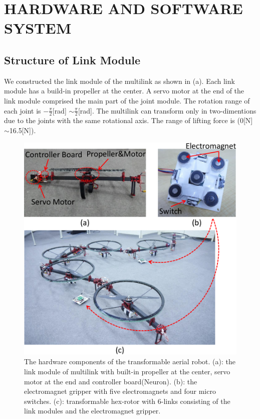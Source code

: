 \section{HARDWARE AND SOFTWARE SYSTEM}
\subsection{Structure of Link Module}
We constructed the link module of the multilink as shown in (a). Each link module has a build-in propeller at the center. A servo motor at the end of the link module comprised the main part of the joint module. The rotation range of each joint is $-\frac{\pi}{2}$[rad] $\sim \frac{\pi}{2}$[rad]. The multilink can transform only in two-dimentions due to the joints with the same rotational axis. The range of lifting force is (0[N]$\sim$16.5[N]). 
 \begin{figure}[t]
  \begin{center}
    \includegraphics[width=1.0\columnwidth]{figs/hardware.pdf}
  \end{center}
  \caption{The hardware components of the transformable aerial robot. (a): the link module of multilink with built-in propeller at the center, servo motor at the end and controller board(Neuron). (b): the electromagnet gripper with five electromagnets and four micro switches. (c): transformable hex-rotor with 6-links consisting of the link modules and the electromagnet gripper. \label{figure:hardware}}
\end{figure}

